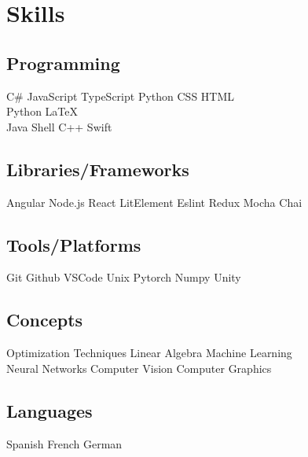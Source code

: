 \documentclass[]{plushcv}
\begin{document}
\hfill
\begin{minipage}[t]{0.25\textwidth}


    \section{Skills}
    \subsection{Programming}
    \sectionsep
    C\# \textbullet{} JavaScript \textbullet{} TypeScript
    \textbullet{} Python \textbullet{} CSS \textbullet{}
    HTML \textbullet{} \\
    \sectionsep
    Python \textbullet{} \LaTeX\ \textbullet{} \\
    \sectionsep
    Java \textbullet{}  Shell \textbullet{} C++ \textbullet{} Swift \\
    \sectionsep
    \sectionsep
    \subsection{Libraries/Frameworks}
    \sectionsep
    Angular \textbullet{} Node.js \textbullet{}
    React \textbullet{} LitElement \textbullet{}
    Eslint \textbullet{} Redux \textbullet{}
    Mocha \textbullet{} Chai
    \\
    \sectionsep
    \sectionsep
    \subsection{Tools/Platforms}
    \sectionsep
    Git \textbullet{} Github \textbullet{}
    VSCode \textbullet{}  Unix \textbullet{}
    Pytorch \textbullet{} Numpy \textbullet{}
    Unity 
    \\
    \sectionsep
    \sectionsep
    \subsection{Concepts}
    \sectionsep
    Optimization Techniques \textbullet{} Linear Algebra \textbullet{}
    Machine Learning \textbullet{} \\ Neural Networks \textbullet{}
    Computer Vision \textbullet{} Computer Graphics
    \sectionsep

    \sectionsep
    \subsection{Languages}
    \sectionsep
    Spanish \textbullet{} French \textbullet{}
    German
    \sectionsep



\end{minipage}
\end{document}
